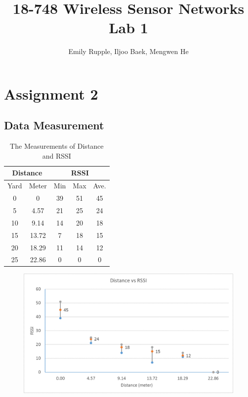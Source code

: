 \documentclass[letterpaper, 12pt]{article}
\title{\textbf{18-748 Wireless Sensor Networks Lab 1}}
\author{Emily Rupple, Iljoo Baek, Mengwen He}
\begin{document}
\maketitle
	
\section{Assignment 2}

\subsection{Data Measurement}

\begin{table}[!h]
	\centering
	\caption{The Measurements of Distance and RSSI}
	\begin{tabular}{|c|c|c|c|c|}
		\hline
		\multicolumn{2}{|c|}{Distance} & \multicolumn{3}{|c|}{RSSI} \\
		\hline
		Yard	&	Meter	&	Min	&	Max	&	Ave.\\
		\hline
		0		&	0		&	39	&	51	&	45	\\
		\hline
		5		&	4.57	&	21	&	25	&	24	\\
		\hline
		10		&	9.14	&	14	&	20	&	18	\\
		\hline
		15		&	13.72	&	7	&	18	&	15	\\
		\hline
		20		&	18.29	&	11	&	14	&	12	\\
		\hline
		25		&	22.86	&	0	&	0	&	0	\\
		\hline
	\end{tabular}
\end{table}

\begin{figure}[!h]
	\centering
	\includegraphics[width=15cm]{./img/data.png}
\end{figure}
\end{document}
